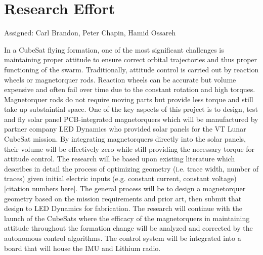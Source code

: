\section{Research Effort}
Assigned: Carl Brandon, Peter Chapin, Hamid Ossareh

In a CubeSat flying formation, one of the most significant challenges
is maintaining proper attitude to ensure correct orbital trajectories
and thus proper functioning of the swarm. Traditionally, attitude
control is carried out by reaction wheels or magnetorquer
rods. Reaction wheels can be accurate but volume expensive and often
fail over time due to the constant rotation and high
torques. Magnetorquer rods do not require moving parts but provide
less torque and still take up substaintial space. One of the key
aspects of this project is to design, test and fly solar panel
PCB-integrated magnetorquers which will be manufactured by partner
company LED Dynamics who provided solar panels for the VT Lunar
CubeSat mission. By integrating magnetorquers directly into the solar
panels, their volume will be effectively zero while still providing
the necessary torque for attitude control. The research will be based
upon existing literature which describes in detail the process of
optimizing geometry (i.e. trace width, number of traces) given initial
electric inputs (e.g. constant current, constant voltage)[citation
  numbers here]. The general process will be to design a magnetorquer geometry based on the mission requirements and prior art, then submit that design to LED Dynamics for fabrication. The research will continue with the launch of the CubeSats where the efficacy of the magnetorquers in maintaining attitude throughout the formation change will be analyzed and corrected by the autonomous control algorithms. The control system will be integrated into a board that will house the IMU and Lithium radio.

